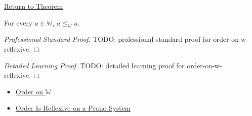 \newpage
{}
\label{prf:order-on-w-reflexive}

\begin{remark*}[Return]
\hyperref[thm:order-on-w-reflexive]{Return to Theorem}
\end{remark*}

\begin{theorem*}
For every $a\in\mathbb{W}$, $a\leq_{\mathbb{W}}a$.
\end{theorem*}

\begin{proof}[Professional Standard Proof]
\LRAProofBodyStart
TODO: professional standard proof for order-on-w-reflexive.
\end{proof}

\begin{proof}[Detailed Learning Proof]
\LRAProofBodyStart
TODO: detailed learning proof for order-on-w-reflexive.
\end{proof}

\begin{remark*}
\end{remark*}

\begin{dependencies}
\begin{itemize}
  \item \hyperref[def:order-on-w]{Order on $\mathbb{W}$}
  \item \hyperref[thm:order-reflexive-on-peano-system]{Order Is Reflexive on a Peano System}
\end{itemize}
\end{dependencies}

\clearpage
